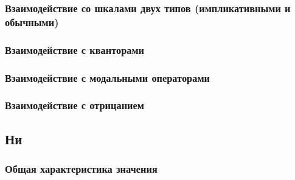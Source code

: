 \documentclass[a4paper, titlepage, 12pt]{article}
\begin{document}
\subsubsection{Взаимодействие со шкалами двух типов (импликативными и обычными)}

\begin{exe}
    \ex \begin{xlist}
        \ex
        \ex
    \end{xlist}
\end{exe}

\subsubsection{Взаимодействие с кванторами}

\begin{exe}
    \ex \begin{xlist}
        \ex
        \ex
    \end{xlist}
\end{exe}

\subsubsection{Взаимодействие с модальными операторами}

\begin{exe}
    \ex \begin{xlist}
        \ex
        \ex
    \end{xlist}
\end{exe}

\subsubsection{Взаимодействие с отрицанием}

\begin{exe}
    \ex \begin{xlist}
        \ex
        \ex
    \end{xlist}
\end{exe}


\subsection{Ни} \label{ni}

\subsubsection{Общая характеристика значения}
\end{document}
